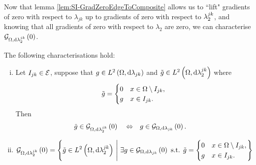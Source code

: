 Now that lemma \ref{lem:SI-GradZeroEdgeToComposite} allows us to ``lift" gradients of zero with respect to $\lambda_{jk}$ up to gradients of zero with respect to $\lambda_2^{jk}$, and knowing that all gradients of zero with respect to $\lambda_2$ are zero, we can characterise $\mathcal{G}_{ \Omega, \mathrm{d}\lambda_2^{jk}}\left( 0 \right)$.
\begin{cory} \label{cory:SI-GradZeroEdgeChar}
	The following characterisations hold:
	\begin{enumerate}[(i)]
		\item Let $I_{jk}\in\mathcal{E}$, suppose that $g\in L^{2}\left( \Omega,\mathrm{d} \lambda_{jk} \right)$ and $\tilde{g}\in L^{2}\left( \Omega,\mathrm{d} \lambda_2^{jk} \right)$ where
		\begin{align*}
			\tilde{g} = \begin{cases} 0 & x\in\Omega\setminus I_{jk}, \\ g & x\in I_{jk}. \end{cases}
		\end{align*}
		Then
		\begin{align*}
			\tilde{g}\in\mathcal{G}_{ \Omega, \mathrm{d}\lambda_2^{jk}}\left( 0 \right) \quad\Leftrightarrow\quad 
			& g\in\mathcal{G}_{ \Omega, \mathrm{d}\lambda_{jk}}\left( 0 \right).
		\end{align*}
		\item
		\begin{align*}
			\mathcal{G}_{ \Omega, \mathrm{d}\lambda_2^{jk}}\left( 0 \right) 
			&= \left\{  \tilde{g}\in L^{2}\left( \Omega,\mathrm{d} \lambda_2^{jk} \right) \ \middle\vert \  \exists g\in\mathcal{G}_{ \Omega, \mathrm{d}\lambda_{jk}}\left( 0 \right) \text{ s.t. } \tilde{g} = \begin{cases} 0 & x\in\Omega\setminus I_{jk}, \\ g & x\in I_{jk}. \end{cases} \right\}
		\end{align*}
	\end{enumerate}
\end{cory}
